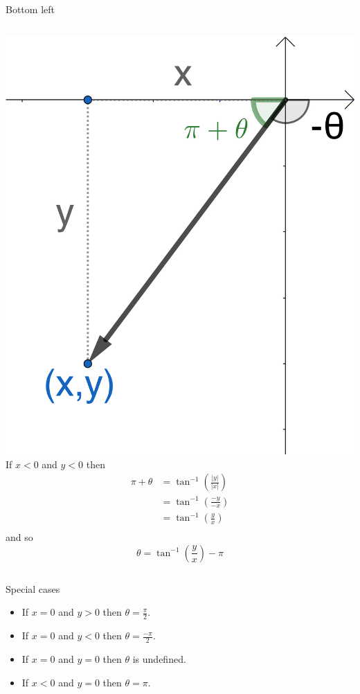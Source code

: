 \documentclass{beamer}
\begin{document}
\begin{frame}{Bottom left}
\begin{columns}
\includegraphics[scale=0.55]{bottom-left.png}
If $x<0$ and $y<0$ then
\begin{align*}
\pi+\theta &= \tan^{-1}\left(\frac{|y|}{|x|}\right)\\
&=\tan^{-1}\left(\frac{-y}{-x}\right)\\
&=\tan^{-1}\left(\frac{y}{x}\right)\\
\end{align*}
and so
\begin{equation*}
\theta = \tan^{-1}\left(\frac{y}{x}\right)-\pi
\end{equation*}
\end{columns}
\end{frame}

\begin{frame}{Special cases}
\begin{itemize}
	\item If $x=0$ and $y>0$ then $\theta = \frac{\pi}{2}$.\vfill
	\item If $x=0$ and $y<0$ then $\theta = \frac{-\pi}{2}$.\vfill
	\item If $x=0$ and $y=0$ then $\theta$ is undefined.\vfill
	\item If $x<0$ and $y=0$ then $\theta = \pi$.
\end{itemize}
\end{frame}
\end{document}
